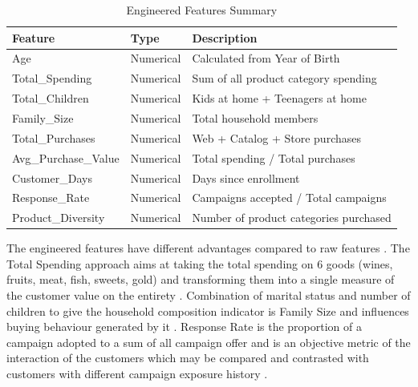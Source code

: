 \documentclass[12pt,a4paper]{report}
\begin{document}
\begin{table}[htbp]
\caption{Engineered Features Summary}
\label{tab:engineered_features}
\centering
\begin{tabular}{|l|l|p{6cm}|}
\hline
\textbf{Feature} & \textbf{Type} & \textbf{Description} \\
\hline
Age & Numerical & Calculated from Year of Birth \\
\hline
Total\_Spending & Numerical & Sum of all product category spending \\
\hline
Total\_Children & Numerical & Kids at home + Teenagers at home \\
\hline
Family\_Size & Numerical & Total household members \\
\hline
Total\_Purchases & Numerical & Web + Catalog + Store purchases \\
\hline
Avg\_Purchase\_Value & Numerical & Total spending / Total purchases \\
\hline
Customer\_Days & Numerical & Days since enrollment \\
\hline
Response\_Rate & Numerical & Campaigns accepted / Total campaigns \\
\hline
Product\_Diversity & Numerical & Number of product categories purchased \\
\hline
\end{tabular}
\end{table}

\noindent The engineered features have different advantages compared to raw features \cite{hughes1994}. The Total Spending approach aims at taking the total spending on 6 goods (wines, fruits, meat, fish, sweets, gold) and transforming them into a single measure of the customer value on the entirety \cite{fader2005}. Combination of marital status and number of children to give the household composition indicator is Family Size and influences buying behaviour generated by it \cite{verhoef2010}. Response Rate is the proportion of a campaign adopted to a sum of all campaign offer and is an objective metric of the interaction of the customers which may be compared and contrasted with customers with different campaign exposure history \cite{neslin2006}.
\end{document}
